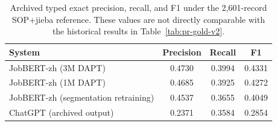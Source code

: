 \begin{table}[htbp]
\caption{Archived typed exact precision, recall, and F1 under the 2,601-record SOP+jieba reference. These values are not directly comparable with the historical results in Table~\ref{tab:pr-gold-v2}.}
\label{tab:pr-p2}
\centering
\small
\begin{tabular}{lccc}
\toprule
\textbf{System} & \textbf{Precision} & \textbf{Recall} & \textbf{F1} \\
\midrule
JobBERT-zh (3M DAPT) & 0.4730 & 0.3994 & 0.4331 \\
JobBERT-zh (1M DAPT) & 0.4685 & 0.3925 & 0.4272 \\
JobBERT-zh (segmentation retraining) & 0.4537 & 0.3655 & 0.4049 \\
ChatGPT (archived output) & 0.2371 & 0.3584 & 0.2854 \\
\bottomrule
\end{tabular}
\end{table}
